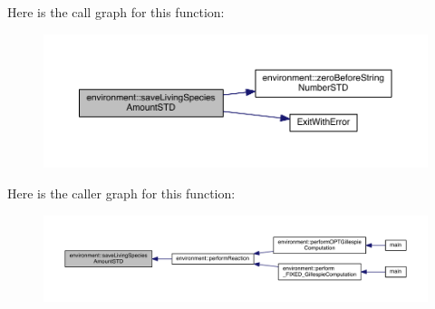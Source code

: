 Here is the call graph for this function\-:
\nopagebreak
\begin{figure}[H]
\begin{center}
\leavevmode
\includegraphics[width=350pt]{a00014_a26c70b0a84c37c87952628d4a328c238_cgraph}
\end{center}
\end{figure}




Here is the caller graph for this function\-:
\nopagebreak
\begin{figure}[H]
\begin{center}
\leavevmode
\includegraphics[width=350pt]{a00014_a26c70b0a84c37c87952628d4a328c238_icgraph}
\end{center}
\end{figure}


